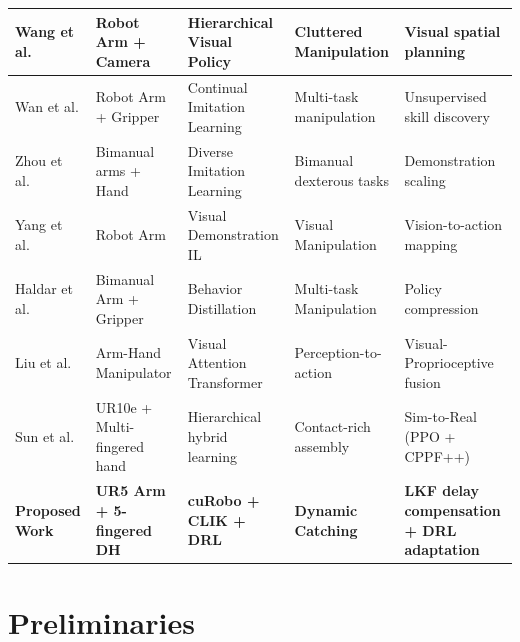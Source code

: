 \documentclass[letterpaper,journal]{IEEEtran}
\begin{document}
\begin{table}[t]
\begin{tabular}{|l|l|l|l|p{4cm}|}
Wang et al. \cite{visual_policy_clutter} & Robot Arm + Camera & Hierarchical Visual Policy & Cluttered Manipulation & Visual spatial planning \\ \hline
Wan et al. \cite{lotus_continual} & Robot Arm + Gripper & Continual Imitation Learning & Multi-task manipulation & Unsupervised skill discovery \\ \hline
Zhou et al. \cite{bimanual_demonstrations} & Bimanual arms + Hand & Diverse Imitation Learning & Bimanual  dexterous tasks & Demonstration scaling \\ \hline
Yang et al. \cite{watch_and_act} & Robot Arm & Visual Demonstration IL & Visual Manipulation & Vision-to-action mapping \\ \hline
Haldar et al. \cite{polytask} & Bimanual Arm + Gripper & Behavior Distillation & Multi-task Manipulation & Policy compression \\ \hline
Liu et al. \cite{fusion_transformer} & Arm-Hand Manipulator & Visual Attention Transformer & Perception-to-action & Visual-Proprioceptive fusion \\ \hline
Sun et al. \cite{hybrid_hybrid_assembly} & UR10e + Multi-fingered hand & Hierarchical hybrid learning & Contact-rich assembly & Sim-to-Real (PPO + CPPF++) \\ \hline
\textbf{Proposed Work} & \textbf{UR5 Arm + 5-fingered DH} & \textbf{cuRobo + CLIK + DRL} & \textbf{Dynamic Catching} & \textbf{LKF delay compensation + DRL adaptation} \\ \hline
\end{tabular}
\end{table}

\section{Preliminaries}
\end{document}
